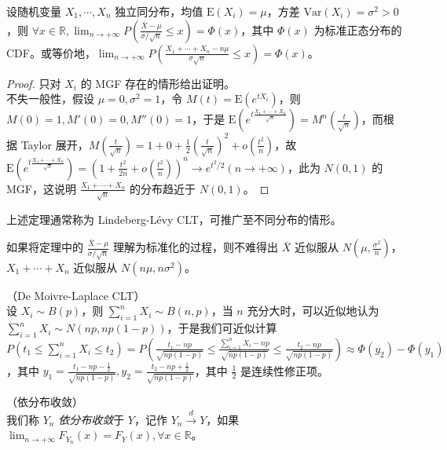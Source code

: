 \documentclass[../main.tex]{subfiles}
\begin{document}
\begin{theorem}\label{thm:5.3.1}
    设随机变量 $X_1,\cdots,X_n$ 独立同分布，均值 $\mathrm E(X_i)=\mu$，方差 $\mathrm{Var}(X_i)=\sigma^2>0$，则 $\forall x\in\mathbb R,\lim_{n\rightarrow+\infty}P\left(\frac{\bar X-\mu}{\sigma/\sqrt n}\leq x\right)=\Phi(x)$，其中 $\Phi(x)$ 为标准正态分布的 CDF。或等价地，$\lim_{n\rightarrow+\infty}P\left(\frac{X_1+\cdots+X_n-n\mu}{\sigma\sqrt n}\leq x\right)=\Phi(x)$。
\end{theorem}

\begin{proof}
    只对 $X_i$ 的 MGF 存在的情形给出证明。\\
    不失一般性，假设 $\mu=0,\sigma^2=1$，令 $M(t)=\mathrm E(e^{tX_i})$，则 $M(0)=1,M'(0)=0,M''(0)=1$，于是 $\mathrm E(e^{t\frac{X_1+\cdots+X_n}{\sqrt n}})=M^n\left(\frac t{\sqrt n}\right)$，而根据 Taylor 展开，$M\left(\frac t{\sqrt n}\right)=1+0+\frac12\left(\frac t{\sqrt n}\right)^2+o\left(\frac{t^2}n\right)$，故 $\mathrm E(e^{t\frac{X_1+\cdots+X_n}{\sqrt n}})=(1+\frac{t^2}{2n}+o(\frac{t^2} n))^n\rightarrow e^{t^2/2}(n\rightarrow+\infty)$，此为 $N(0,1)$ 的 MGF，这说明 $\frac{X_1+\cdots+X_n}{\sqrt n}$ 的分布趋近于 $N(0,1)$。
\end{proof}

上述定理通常称为 Lindeberg-Lévy CLT，可推广至不同分布的情形。

如果将定理中的 $\frac{\bar X-\mu}{\sigma/\sqrt n}$ 理解为标准化的过程，则不难得出 $\bar X$ 近似服从 $N(\mu,\frac{\sigma^2}n)$，$X_1+\cdots+X_n$ 近似服从 $N(n\mu,n\sigma^2)$。

\begin{example}
    （De Moivre-Laplace CLT）\\
    设 $X_i\sim B(p)$，则 $\sum_{i=1}^nX_i\sim B(n,p)$，当 $n$ 充分大时，可以近似地认为 $\sum_{i=1}^nX_i\sim N(np,np(1-p))$，于是我们可近似计算 $P(t_1\leq \sum_{i=1}^nX_i\leq t_2)=P\left(\frac{t_1-np}{\sqrt{np(1-p)}}\leq\frac{\sum_{i=1}^nX_i-np}{\sqrt{np(1-p)}}\leq\frac{t_2-np}{\sqrt{np(1-p)}}\right)\approx \Phi(y_2)-\Phi(y_1)$，其中 $y_1=\frac{t_1-np-\frac12}{\sqrt{np(1-p)}},y_2=\frac{t_2-np+\frac12}{\sqrt{np(1-p)}}$，其中 $\frac12$ 是连续性修正项。
\end{example}

\begin{definition}\label{def:5.3.1}
    （依分布收敛）\\
    我们称 $Y_n$ \emph{依分布收敛}于 $Y$，记作 $Y_n\overset{d}\rightarrow Y$，如果 $\lim_{n\rightarrow+\infty}F_{Y_n}(x)=F_Y(x),\forall x\in\mathbb R$。
\end{definition}
\end{document}
